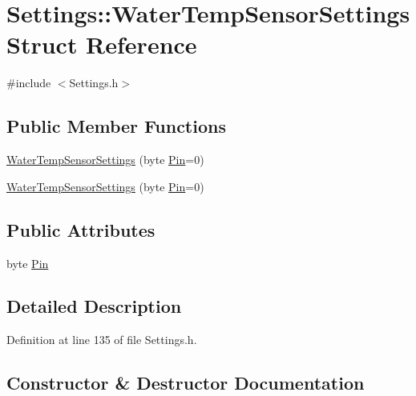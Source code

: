 \hypertarget{struct_settings_1_1_water_temp_sensor_settings}{}\section{Settings\+:\+:Water\+Temp\+Sensor\+Settings Struct Reference}
\label{struct_settings_1_1_water_temp_sensor_settings}


{\ttfamily \#include $<$Settings.\+h$>$}

\subsection*{Public Member Functions}
\begin{DoxyCompactItemize}
\item 
\hyperlink{struct_settings_1_1_water_temp_sensor_settings_aa378b0c140958fdb97b6e59d51318209}{Water\+Temp\+Sensor\+Settings} (byte \hyperlink{struct_settings_1_1_water_temp_sensor_settings_a8259c47ff82a961e88aa4d407f2eb18f}{Pin}=0)
\item 
\hyperlink{struct_settings_1_1_water_temp_sensor_settings_aa378b0c140958fdb97b6e59d51318209}{Water\+Temp\+Sensor\+Settings} (byte \hyperlink{struct_settings_1_1_water_temp_sensor_settings_a8259c47ff82a961e88aa4d407f2eb18f}{Pin}=0)
\end{DoxyCompactItemize}
\subsection*{Public Attributes}
\begin{DoxyCompactItemize}
\item 
byte \hyperlink{struct_settings_1_1_water_temp_sensor_settings_a8259c47ff82a961e88aa4d407f2eb18f}{Pin}
\end{DoxyCompactItemize}


\subsection{Detailed Description}


Definition at line 135 of file Settings.\+h.



\subsection{Constructor \& Destructor Documentation}
\mbox{\label{struct_settings_1_1_water_temp_sensor_settings_aa378b0c140958fdb97b6e59d51318209}} 
